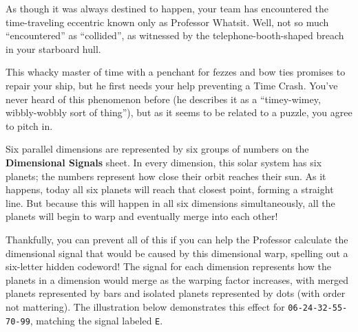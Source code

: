 As though it was always destined to happen, your team has encountered
the time-traveling eccentric known only as Professor Whatsit. Well, not
so much ``encountered'' as ``collided'', as witnessed by the 
telephone-booth-shaped breach in your starboard hull.

This whacky master of time with a penchant for fezzes and bow ties promises to
repair your ship, but he first needs your help preventing a
Time Crash. You've never heard of this phenomenon before (he describes it as a
``timey-wimey, wibbly-wobbly sort of thing''), but as it seems to be 
related to a puzzle, you agree to pitch in.

Six parallel dimensions are represented by six groups of numbers on
the \textbf{Dimensional Signals} sheet. In every dimension, this solar system
has six planets; the numbers represent how close their orbit reaches their sun.
As it happens, today all six planets will reach that closest
point, forming a straight line. But because this will happen
in all six dimensions simultaneously, all the planets will begin
to warp and eventually merge into each other!
%

Thankfully, you can prevent all of this if you can help the Professor
calculate the dimensional signal that would be caused by this dimensional
warp, spelling out a six-letter hidden codeword!
The signal for each dimension represents how
the planets in a dimension would merge as the warping factor increases,
with merged planets represented by bars and isolated planets represented
by dots (with order not mattering). 
The illustration below demonstrates this effect for \texttt{06-24-32-55-70-99},
matching the signal labeled \texttt{E}.

